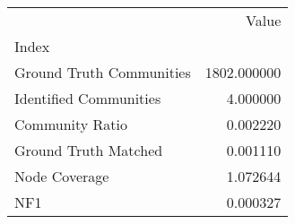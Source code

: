 \begin{tabular}{lr}
\toprule
{} &        Value \\
Index                    &              \\
\midrule
Ground Truth Communities &  1802.000000 \\
Identified Communities   &     4.000000 \\
Community Ratio          &     0.002220 \\
Ground Truth Matched     &     0.001110 \\
Node Coverage            &     1.072644 \\
NF1                      &     0.000327 \\
\bottomrule
\end{tabular}
